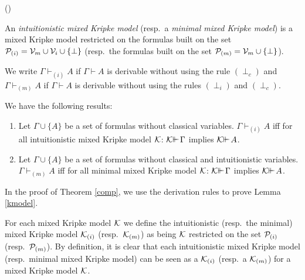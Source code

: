 \documentclass{jancl}
\begin{document}
\begin{definition}
\begin{janclenum}{(\arabic}{)}
\item An \emph{intuitionistic mixed Kripke model} (resp.\ a
\emph{minimal  mixed Kripke model}) is a mixed Kripke model
restricted on the formulas built on the set ${\cal P}_{(i)} =
{\cal V}_m \cup {\cal V}_i \cup \{ \perp \}$ (resp.\ the formulas
built on the set ${\cal P}_{(m)} = {\cal V}_m \cup \{ \perp \}$).

\item We write ${\Gamma} {\vdash}_{(i)} A$ if ${\Gamma} {\vdash} A$ is derivable without
using the rule $(\perp_c)$ and ${\Gamma} {\vdash}_{(m)} A$ if ${\Gamma} {\vdash} A$ is
derivable without using the rules $(\perp_i)$ and $(\perp_c)$.
\end{janclenum}
\end{definition}

We have the following results:
\begin{theorem} \label{comp'}
\begin{enumerate}
\item Let ${\Gamma} \cup \{ A \}$ be a set of formulas without classical
variables. ${\Gamma} {\vdash}_{(i)} A$ iff for all intuitionistic  mixed
Kripke model ${\cal K}$: ${\cal K} {\ifmmode{ {\vdash}\mkern-7.6mu
{\vdash}\mkern2mu}\else{ {\vdash}\kern-.28em
{\vdash}\hskip1pt\ }\fi\relax} {\Gamma}$ implies ${\cal K}
{\ifmmode{ {\vdash}\mkern-7.6mu
{\vdash}\mkern2mu}\else{ {\vdash}\kern-.28em
{\vdash}\hskip1pt\ }\fi\relax} A$.

\item Let ${\Gamma} \cup \{ A \}$ be a set of formulas without classical
and intuitionistic variables.  ${\Gamma} {\vdash}_{(m)} A$ iff for all minimal
mixed Kripke model ${\cal K}$: ${\cal K} {\ifmmode{ {\vdash}\mkern-7.6mu
{\vdash}\mkern2mu}\else{ {\vdash}\kern-.28em
{\vdash}\hskip1pt\ }\fi\relax} {\Gamma}$ implies
${\cal K} {\ifmmode{ {\vdash}\mkern-7.6mu
{\vdash}\mkern2mu}\else{ {\vdash}\kern-.28em
{\vdash}\hskip1pt\ }\fi\relax} A$.
\end{enumerate}
\end{theorem}

\begin{proof*}
In the proof of Theorem \ref{comp}, we use
the derivation rules to prove Lemma \ref{kmodel}.
\end{proof*}

\begin{definition}
For each  mixed Kripke model ${\cal K}$ we define the
intuitionistic (resp.\ the minimal)  mixed Kripke model ${\cal
K}_{(i)}$ (resp.\ ${\cal K}_{(m)}$) as being ${\cal K}$ restricted
on the set ${\cal P}_{(i)}$ (resp.\ ${\cal P}_{(m)}$). By
definition, it is clear that each intuitionistic  mixed Kripke
model (resp.\ minimal mixed Kripke model) can be seen as a ${\cal
K}_{(i)}$ (resp.\ a ${\cal K}_{(m)}$) for a  mixed Kripke model
${\cal K}$.
\end{definition}
\end{document}
